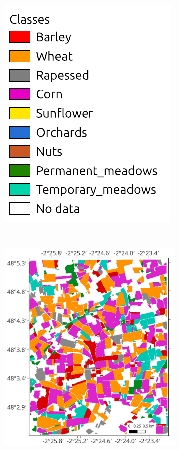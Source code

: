\documentclass[journal,article,submit,pdftex,moreauthors]{Definitions/mdpi}
\providecommand{\DIFaddbeginFL}{} %
\begin{document}
\begin{figure}[H]
\begin{subfigure}[t]{0.15\linewidth}
    \includegraphics[width=\textwidth]{figures/aes_1_layer_mse_results/labels.pdf}
	\end{subfigure}\DIFaddbeginFL \\
    \begin{subfigure}[t]{0.35\linewidth}
    \includegraphics[height=\linewidth,width=\textwidth]{round2_remote_sensing_Andrea_Gonzalez/figures/classification_maps/test_aoi_field-base.pdf}

\end{subfigure}
\end{figure}
\end{document}
